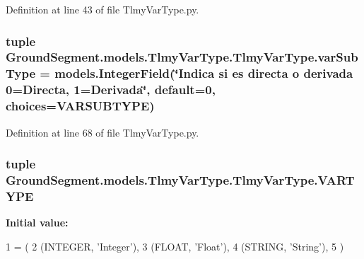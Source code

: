 Definition at line 43 of file Tlmy\+Var\+Type.\+py.

\hypertarget{class_ground_segment_1_1models_1_1_tlmy_var_type_1_1_tlmy_var_type_ad7c03c17c8743df66707b060faeb94a3}{}
\subsubsection[{var\+Sub\+Type}]{\setlength{\rightskip}{0pt plus 5cm}tuple Ground\+Segment.\+models.\+Tlmy\+Var\+Type.\+Tlmy\+Var\+Type.\+var\+Sub\+Type = models.\+Integer\+Field(\char`\"{}Indica si es directa o derivada 0=Directa, 1=Derivada\char`\"{}, default=0, choices={\bf V\+A\+R\+S\+U\+B\+T\+Y\+P\+E})\hspace{0.3cm}{\ttfamily [static]}}\label{class_ground_segment_1_1models_1_1_tlmy_var_type_1_1_tlmy_var_type_ad7c03c17c8743df66707b060faeb94a3}


Definition at line 68 of file Tlmy\+Var\+Type.\+py.

\hypertarget{class_ground_segment_1_1models_1_1_tlmy_var_type_1_1_tlmy_var_type_a9a9b6dcda859afbf512855888fd787fa}{}
\subsubsection[{V\+A\+R\+T\+Y\+P\+E}]{\setlength{\rightskip}{0pt plus 5cm}tuple Ground\+Segment.\+models.\+Tlmy\+Var\+Type.\+Tlmy\+Var\+Type.\+V\+A\+R\+T\+Y\+P\+E\hspace{0.3cm}{\ttfamily [static]}}\label{class_ground_segment_1_1models_1_1_tlmy_var_type_1_1_tlmy_var_type_a9a9b6dcda859afbf512855888fd787fa}
{\bfseries Initial value\+:}
\begin{DoxyCode}
1 = (
2         (INTEGER, \textcolor{stringliteral}{'Integer'}),
3         (FLOAT, \textcolor{stringliteral}{'Float'}),
4         (STRING, \textcolor{stringliteral}{'String'}),
5     )
\end{DoxyCode}


